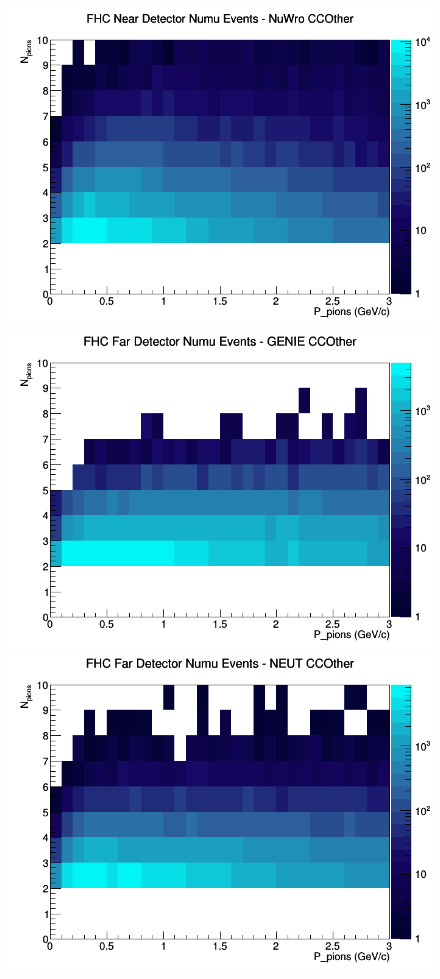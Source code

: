 \documentclass[12pt]{article}
\begin{document}
\begin{figure}[h]
\includegraphics[width=\linewidth]{N_P/nominal/pions/CCOther_FHC_ND_numu_N_P_NuWro.png}
\endminipage
\newline
{}
\includegraphics[width=\linewidth]{N_P/nominal/pions/CCOther_FHC_FD_numu_N_P_GENIE.png}
\endminipage
{}
\includegraphics[width=\linewidth]{N_P/nominal/pions/CCOther_FHC_FD_numu_N_P_NEUT.png}

\end{figure}
\end{document}
